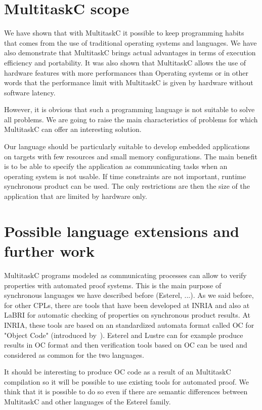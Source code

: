 \documentclass[10pt]{report}
\begin{document}
\section{MultitaskC scope}

We have shown that with MultitaskC it possible to keep programming habits that comes from the use of traditional
operating systems and languages. We have also demonstrate that MultitaskC brings actual advantages in terms of
execution efficiency and portability. It was also shown that MultitaskC allows the use of hardware features with
more performances than Operating systems or in other words that the performance limit with MultitaskC is given
by hardware without software latency.

However, it is obvious that such a programming language is not suitable to solve all problems. We are going to
raise the main characteristics of problems for which MultitaskC can offer an interesting solution.

Our language should be particularly suitable to develop embedded applications on targets with few resources and small
memory configurations. The main benefit is to be able to specify the application as communicating tasks when an operating
system is not usable. If time constraints are not important, runtime synchronous product can be used. The only restrictions
are then the size of the application that are limited by hardware only.

\section{Possible language extensions and further work}

MultitaskC programs modeled as communicating processes can allow to verify properties with automated proof systems. This
is the main purpose of synchronous languages we have described before (Esterel, ...). As we said before, for other CPLs, there
are tools that have been developed at INRIA and also at LaBRI for automatic checking of properties on synchronous
product results. At INRIA, these tools are based on an standardized automata format called OC for "Object Code" (introduced
by~\cite{Halbwachs:91}). Esterel and Lustre can for example produce results in OC format and then verification tools
based on OC can be used and considered as common for the two languages.

It should be interesting to produce OC code as a result of an MultitaskC compilation so it will be possible to use
existing tools for automated proof. We think that it is possible to do so even if there are semantic differences between
MultitaskC and other languages of the Esterel family.
\end{document}
